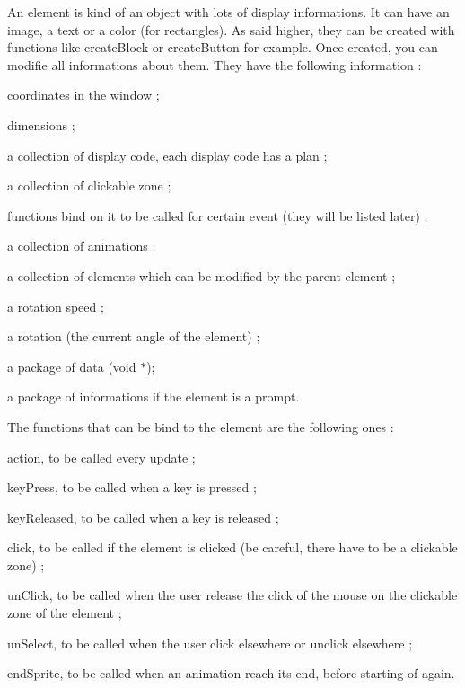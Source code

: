 An element is kind of an object with lots of display informations. It can have an image, a text or a color (for rectangles). As said higher, they can be created with functions like create\+Block or create\+Button for example. Once created, you can modifie all informations about them. They have the following information \+:
\begin{DoxyItemize}
\item coordinates in the window ;
\item dimensions ;
\item a collection of display code, each display code has a plan ;
\item a collection of clickable zone ;
\item functions bind on it to be called for certain event (they will be listed later) ;
\item a collection of animations ;
\item a collection of elements which can be modified by the parent element ;
\item a rotation speed ;
\item a rotation (the current angle of the element) ;
\item a package of data (void $\ast$);
\item a package of informations if the element is a prompt. ~\newline
~\newline


The functions that can be bind to the element are the following ones \+:
\item action, to be called every update ;
\item key\+Press, to be called when a key is pressed ;
\item key\+Released, to be called when a key is released ;
\item click, to be called if the element is clicked (be careful, there have to be a clickable zone) ;
\item un\+Click, to be called when the user release the click of the mouse on the clickable zone of the element ;
\item un\+Select, to be called when the user click elsewhere or unclick elsewhere ;
\item end\+Sprite, to be called when an animation reach its end, before starting of again. ~\newline
~\newline



\end{DoxyItemize}
